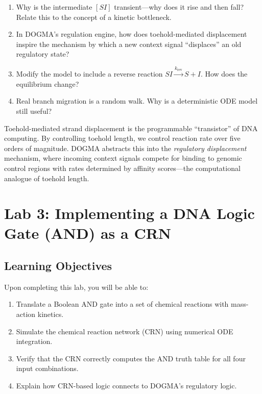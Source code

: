 \begin{enumerate}[leftmargin=1.8em]
  \item Why is the intermediate $[SI]$ transient---why does it rise and then fall? Relate this to the concept of a kinetic bottleneck.
  \item In DOGMA's regulation engine, how does toehold-mediated displacement inspire the mechanism by which a new context signal ``displaces'' an old regulatory state?
  \item Modify the model to include a reverse reaction $SI \xrightarrow{k_{\text{rev}}} S + I$. How does the equilibrium change?
  \item Real branch migration is a random walk. Why is a deterministic ODE model still useful?
\end{enumerate}

\begin{keyinsight}
Toehold-mediated strand displacement is the programmable ``transistor'' of DNA computing. By controlling toehold length, we control reaction rate over five orders of magnitude. DOGMA abstracts this into the \emph{regulatory displacement} mechanism, where incoming context signals compete for binding to genomic control regions with rates determined by affinity scores---the computational analogue of toehold length.
\end{keyinsight}


\section{Lab 3: Implementing a DNA Logic Gate (AND) as a CRN}
\label{sec:lab3-crn-logic}

\subsection{Learning Objectives}

Upon completing this lab, you will be able to:
\begin{enumerate}[leftmargin=1.8em]
  \item Translate a Boolean AND gate into a set of chemical reactions with mass-action kinetics.
  \item Simulate the chemical reaction network (CRN) using numerical ODE integration.
  \item Verify that the CRN correctly computes the AND truth table for all four input combinations.
  \item Explain how CRN-based logic connects to DOGMA's regulatory logic.
\end{enumerate}


